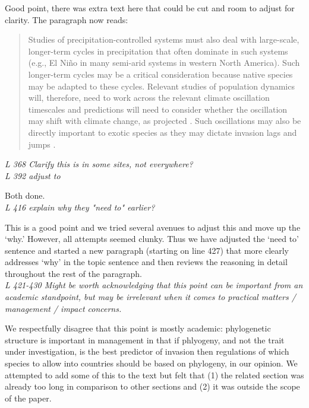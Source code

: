 \documentclass[11pt,a4paper]{letter}
\begin{document}
\begin{letter}{}
Good point, there was extra text here that could be cut and room to adjust for clarity. The paragraph now reads:
\begin{quote}
Studies of precipitation-controlled systems must also deal with large-scale, longer-term cycles in precipitation that often dominate in such systems (e.g., El Ni\~{n}o in many semi-arid systems in western North America). Such longer-term cycles may be a critical consideration because native species may be adapted to these cycles. Relevant studies of population dynamics will, therefore, need to work across the relevant climate oscillation timescales and predictions will need to consider whether the oscillation may shift with climate change, as projected \citep{ipccPhys2007}. Such oscillations may also be directly important to exotic species as they may dictate invasion lags and jumps \citep{Salo:2005eo}. \\
\end{quote}

\emph{L 368 Clarify this is in some sites, not everywhere?\\
{L 392 adjust to}}

Both done.\\

\emph{L 416 explain why they "need to" earlier?}

This is a good point and we tried several avenues to adjust this and move up the `why.' However, all attempts seemed clunky. Thus we have adjusted the `need to' sentence and started a new paragraph (starting on line 427) that more clearly addresses `why' in the topic sentence and then reviews the reasoning in detail throughout the rest of the paragraph.\\

\emph{L 421-430 Might be worth acknowledging that this point can be important from an academic standpoint, but may be irrelevant when it comes to practical matters / management / impact concerns.}

We respectfully disagree that this point is mostly academic: phylogenetic structure is important in management in that if phlyogeny, and not the trait under investigation, is the best predictor of invasion then regulations of which species to allow into countries should be based on phylogeny, in our opinion. We attempted to add some of this to the text but felt that (1) the related section was already too long in comparison to other sections and (2) it was outside the scope of the paper. \\


\end{letter}
\end{document}
